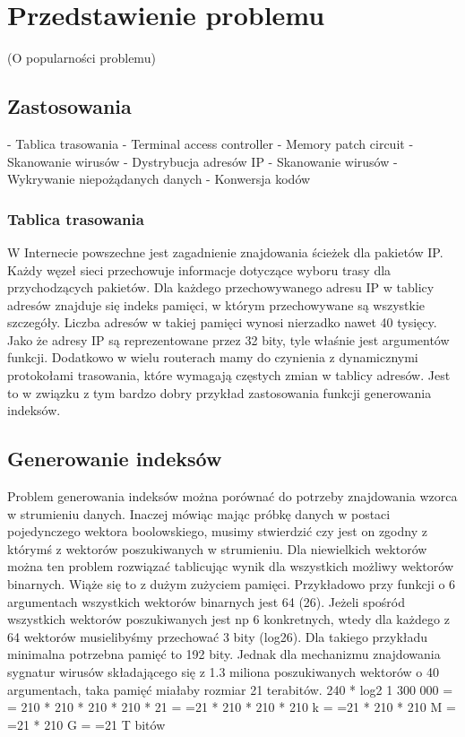 \chapter{Przedstawienie problemu}
(O popularności problemu)

\section{Zastosowania}
- Tablica trasowania
- Terminal access controller
- Memory patch circuit
- Skanowanie wirusów
- Dystrybucja adresów IP
- Skanowanie wirusów
- Wykrywanie niepożądanych danych
- Konwersja kodów

\subsection{Tablica trasowania}
W Internecie powszechne jest zagadnienie znajdowania ścieżek dla pakietów IP.
Każdy węzeł sieci przechowuje informacje dotyczące wyboru trasy dla przychodzących pakietów.
Dla każdego przechowywanego adresu IP w tablicy adresów znajduje się indeks pamięci, w którym przechowywane są wszystkie szczegóły.
Liczba adresów w takiej pamięci wynosi nierzadko nawet 40 tysięcy.
Jako że adresy IP są reprezentowane przez 32 bity, tyle właśnie jest argumentów funkcji.
Dodatkowo w wielu routerach mamy do czynienia z dynamicznymi protokołami trasowania, które wymagają częstych zmian w tablicy adresów.
Jest to w związku z tym bardzo dobry przykład zastosowania funkcji generowania indeksów.

\section{Generowanie indeksów}

Problem generowania indeksów można porównać do potrzeby znajdowania wzorca w strumieniu danych.
Inaczej mówiąc mając próbkę danych w postaci pojedynczego wektora boolowskiego, musimy stwierdzić czy jest on zgodny z którymś z wektorów poszukiwanych w strumieniu.
Dla niewielkich wektorów można ten problem rozwiązać tablicując wynik dla wszystkich możliwy wektorów binarnych.
Wiąże się to z dużym zużyciem pamięci.
Przykładowo przy funkcji o 6 argumentach wszystkich wektorów binarnych jest 64 (26).
Jeżeli spośród wszystkich wektorów poszukiwanych jest np 6 konkretnych, wtedy dla każdego z 64 wektorów musielibyśmy przechować 3 bity (log26).
Dla takiego przykładu minimalna potrzebna pamięć to 192 bity.
Jednak dla mechanizmu znajdowania sygnatur wirusów składającego się z 1.3 miliona poszukiwanych wektorów o 40 argumentach, taka pamięć miałaby rozmiar 21 terabitów.
240 * log2 1 300 000 =
= 210 * 210 * 210 * 210 * 21 =
=21 * 210 * 210 * 210 k =
=21 * 210 * 210 M =
=21 * 210 G =
=21 T bitów


